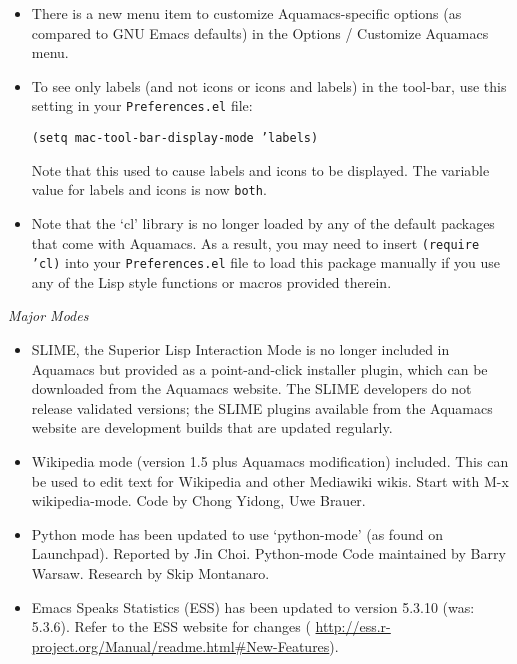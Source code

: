 \begin{itemize}
\item There is a new menu item to customize Aquamacs-specific options (as compared to GNU Emacs defaults) in the
Options / Customize Aquamacs menu.

\item To see only labels (and not icons or icons and labels) in the tool-bar, use this setting in your {\tt Preferences.el} file:

{\tt (setq mac-tool-bar-display-mode 'labels)}

Note that this used to cause labels and icons to be displayed.  The variable value for labels and icons is now {\tt both}.

\item Note that  the `cl' library is no longer loaded by any of the default packages that come with Aquamacs.  As a result, you may need to insert {\tt (require 'cl)} into your {\tt Preferences.el} file to load this package manually if you use any of the Lisp style functions or macros provided therein.

\end{itemize}

\emph{Major Modes}

\begin{itemize}

\item SLIME, the Superior Lisp Interaction Mode is no longer included in Aquamacs but provided as a point-and-click installer plugin, which can be downloaded from the Aquamacs website.  The SLIME developers do not release validated versions; the SLIME plugins available from the Aquamacs website are development builds that are updated regularly.

\item Wikipedia mode (version 1.5 plus Aquamacs modification) included.  This can be used to edit text for Wikipedia and other Mediawiki wikis.  Start with M-x wikipedia-mode.
Code by Chong Yidong, Uwe Brauer.

\item Python mode has been updated to use `python-mode'  (as found on Launchpad).
Reported by Jin Choi.  Python-mode Code maintained by Barry Warsaw.  Research by Skip Montanaro.

\item Emacs Speaks Statistics (ESS) has been updated to version 5.3.10 (was: 5.3.6).  Refer to the ESS website for changes ({\small{ \url{http://ess.r-project.org/Manual/readme.html#New-Features}}}).

\end{itemize}

